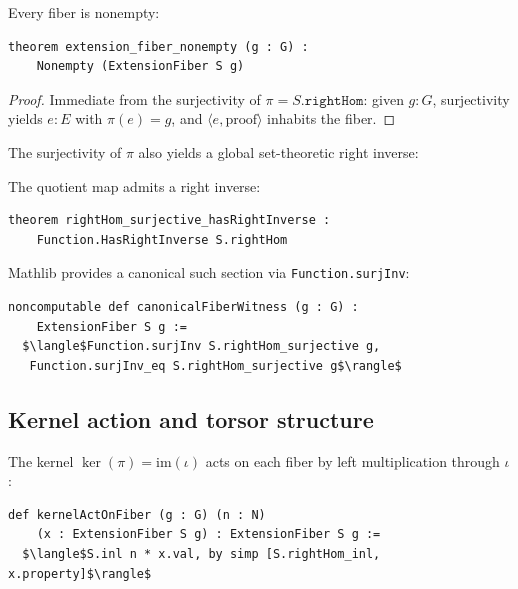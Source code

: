 \documentclass[11pt]{article}
\newcommand{\im}{\mathrm{im}}
\newcommand{\lean}[1]{\texttt{#1}}
\begin{document}
\begin{theorem}\label{thm:fiber-nonempty}
Every fiber is nonempty:
\begin{lstlisting}
theorem extension_fiber_nonempty (g : G) :
    Nonempty (ExtensionFiber S g)
\end{lstlisting}
\end{theorem}

\begin{proof}
Immediate from the surjectivity of $\pi = S.\lean{rightHom}$: given $g : G$,
surjectivity yields $e : E$ with $\pi(e) = g$, and $\langle e, \text{proof} \rangle$
inhabits the fiber.
\end{proof}

The surjectivity of $\pi$ also yields a global set-theoretic right inverse:

\begin{theorem}\label{thm:hasri}
The quotient map admits a right inverse:
\begin{lstlisting}
theorem rightHom_surjective_hasRightInverse :
    Function.HasRightInverse S.rightHom
\end{lstlisting}
\end{theorem}

Mathlib provides a canonical such section via \lean{Function.surjInv}:

\begin{lstlisting}[mathescape=true]
noncomputable def canonicalFiberWitness (g : G) :
    ExtensionFiber S g :=
  $\langle$Function.surjInv S.rightHom_surjective g,
   Function.surjInv_eq S.rightHom_surjective g$\rangle$
\end{lstlisting}

\subsection{Kernel action and torsor structure}\label{sec:torsor}

The kernel $\ker(\pi) = \im(\iota)$ acts on each fiber by left multiplication
through $\iota$:

\begin{definition}\label{def:kernel-act}
\begin{lstlisting}[mathescape=true]
def kernelActOnFiber (g : G) (n : N)
    (x : ExtensionFiber S g) : ExtensionFiber S g :=
  $\langle$S.inl n * x.val, by simp [S.rightHom_inl, x.property]$\rangle$
\end{lstlisting}
\end{definition}
\end{document}
